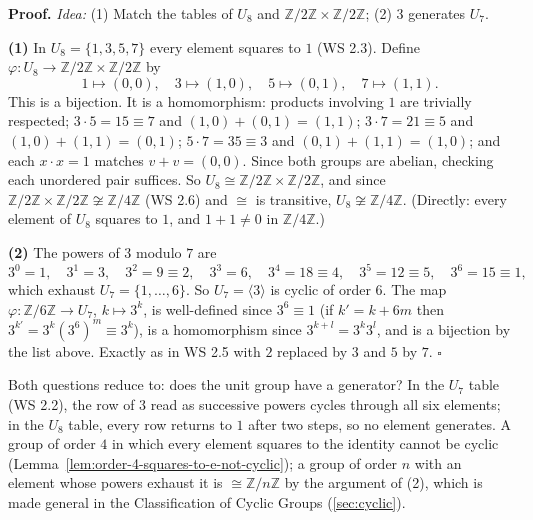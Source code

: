 \documentclass[11pt]{report}
\renewenvironment{proof}[1][Proof]{\noindent\textbf{#1.} }{\hfill$\square$\par\vspace{5pt}}
\begin{document}
\begin{proof}
\textit{Idea:} (1) Match the tables of $U_8$ and $\mathbb{Z}/2\mathbb{Z} \times \mathbb{Z}/2\mathbb{Z}$; (2) $3$ generates $U_7$.\par
\textbf{(1)} In $U_8 = \{1, 3, 5, 7\}$ every element squares to $1$ (WS 2.3). Define $\varphi: U_8 \to \mathbb{Z}/2\mathbb{Z} \times \mathbb{Z}/2\mathbb{Z}$ by
\[ 1 \mapsto (0,0), \quad 3 \mapsto (1,0), \quad 5 \mapsto (0,1), \quad 7 \mapsto (1,1). \]
This is a bijection. It is a homomorphism: products involving $1$ are trivially respected; $3 \cdot 5 = 15 \equiv 7$ and $(1,0)+(0,1) = (1,1)$; $3 \cdot 7 = 21 \equiv 5$ and $(1,0)+(1,1) = (0,1)$; $5 \cdot 7 = 35 \equiv 3$ and $(0,1)+(1,1) = (1,0)$; and each $x \cdot x = 1$ matches $v + v = (0,0)$. Since both groups are abelian, checking each unordered pair suffices. So $U_8 \cong \mathbb{Z}/2\mathbb{Z}\times\mathbb{Z}/2\mathbb{Z}$, and since $\mathbb{Z}/2\mathbb{Z}\times\mathbb{Z}/2\mathbb{Z} \not\cong \mathbb{Z}/4\mathbb{Z}$ (WS 2.6) and $\cong$ is transitive, $U_8 \not\cong \mathbb{Z}/4\mathbb{Z}$. (Directly: every element of $U_8$ squares to $1$, and $1 + 1 \neq 0$ in $\mathbb{Z}/4\mathbb{Z}$.)

\textbf{(2)} The powers of $3$ modulo $7$ are
\[ 3^0 = 1, \quad 3^1 = 3, \quad 3^2 = 9 \equiv 2, \quad 3^3 = 6, \quad 3^4 = 18 \equiv 4, \quad 3^5 = 12 \equiv 5, \quad 3^6 = 15 \equiv 1, \]
which exhaust $U_7 = \{1, \ldots, 6\}$. So $U_7 = \langle 3 \rangle$ is cyclic of order $6$. The map $\varphi: \mathbb{Z}/6\mathbb{Z} \to U_7$, $k \mapsto 3^k$, is well-defined since $3^6 \equiv 1$ (if $k' = k + 6m$ then $3^{k'} = 3^k (3^6)^m \equiv 3^k$), is a homomorphism since $3^{k+l} = 3^k 3^l$, and is a bijection by the list above. Exactly as in WS 2.5 with $2$ replaced by $3$ and $5$ by $7$.
\end{proof}

\begin{rembox}\label{rem:reading-cyclicity-off-table}
Both questions reduce to: does the unit group have a generator? In the $U_7$ table (WS 2.2), the row of $3$ read as successive powers cycles through all six elements; in the $U_8$ table, every row returns to $1$ after two steps, so no element generates. A group of order $4$ in which every element squares to the identity cannot be cyclic (Lemma~\ref{lem:order-4-squares-to-e-not-cyclic}); a group of order $n$ with an element whose powers exhaust it is $\cong \mathbb{Z}/n\mathbb{Z}$ by the argument of (2), which is made general in the Classification of Cyclic Groups (\ref{sec:cyclic}).
\end{rembox}
\end{document}
